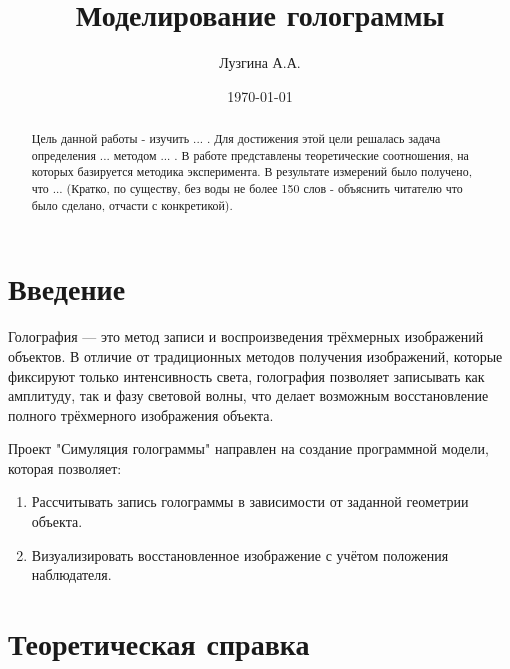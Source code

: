 \documentclass[aps,twocolumn,secnumarabic,balancelastpage,amsmath,amssymb,nofootinbib, floatfix]{revtex4-1}
\begin{document}
	\title{Моделирование голограммы\\}
	\author{Лузгина А.А.}
	\date{\today}
	
	
	\begin{abstract}
		Цель данной работы - изучить ... . Для достижения этой цели решалась задача определения ... методом ... . В работе представлены теоретические соотношения, на которых базируется методика эксперимента. В результате измерений было получено, что ... (Кратко, по существу, без воды не более 150 слов - объяснить читателю что было сделано, отчасти с конкретикой). 
		
	\end{abstract}
	
	\maketitle
	
	
	
	



		\section{Введение}  

Голография — это метод записи и воспроизведения трёхмерных изображений объектов. В отличие от традиционных методов получения изображений, которые фиксируют только интенсивность света, голография позволяет записывать как амплитуду, так и фазу световой волны, что делает возможным восстановление полного трёхмерного изображения объекта.  

Проект "Симуляция голограммы" направлен на создание программной модели, которая позволяет:  \begin{enumerate}
\item Рассчитывать запись голограммы в зависимости от заданной геометрии объекта.  
\item Визуализировать восстановленное изображение с учётом положения наблюдателя.  
\end{enumerate}

\section{Теоретическая справка} 
\end{document}
